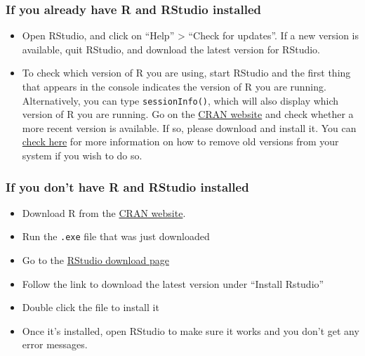 \documentclass[
]{book}
\providecommand{\tightlist}{%
  \setlength{\itemsep}{0pt}\setlength{\parskip}{0pt}}
\begin{document}
\hypertarget{if-you-already-have-r-and-rstudio-installed-1}{%
\subsubsection*{If you already have R and RStudio installed}\label{if-you-already-have-r-and-rstudio-installed-1}}

\begin{itemize}
\tightlist
\item
  Open RStudio, and click on ``Help'' \textgreater{} ``Check for updates''. If a new version is
  available, quit RStudio, and download the latest version for RStudio.
\item
  To check which version of R you are using, start RStudio and the first thing
  that appears in the console indicates the version of R you are
  running. Alternatively, you can type \texttt{sessionInfo()}, which will also display
  which version of R you are running. Go on
  the \href{https://cran.r-project.org/bin/windows/base/}{CRAN website} and check
  whether a more recent version is available. If so, please download and install
  it. You can \href{https://cran.r-project.org/bin/windows/base/rw-FAQ.html\#How-do-I-UNinstall-R_003f}{check here} for
  more information on how to remove old versions from your system if you wish to do so.
\end{itemize}

\hypertarget{if-you-dont-have-r-and-rstudio-installed-1}{%
\subsubsection*{If you don't have R and RStudio installed}\label{if-you-dont-have-r-and-rstudio-installed-1}}

\begin{itemize}
\tightlist
\item
  Download R from
  the \href{http://cran.r-project.org/bin/windows/base/release.htm}{CRAN website}.
\item
  Run the \texttt{.exe} file that was just downloaded
\item
  Go to the \href{https://posit.co/download/rstudio-desktop/}{RStudio download page}
\item
  Follow the link to download the latest version under ``Install Rstudio''
\item
  Double click the file to install it
\item
  Once it's installed, open RStudio to make sure it works and you don't get any
  error messages.
\end{itemize}
\end{document}
